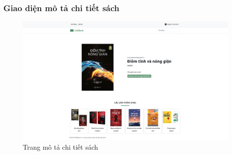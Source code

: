 \subsubsection{Giao diện mô tả chi tiết sách}
\begin{figure}[H]
  \centering
  \includegraphics[width=1\textwidth]{report/images/client/c_sach_detail.png}
  \caption{Trang mô tả chi tiết sách}
\end{figure}